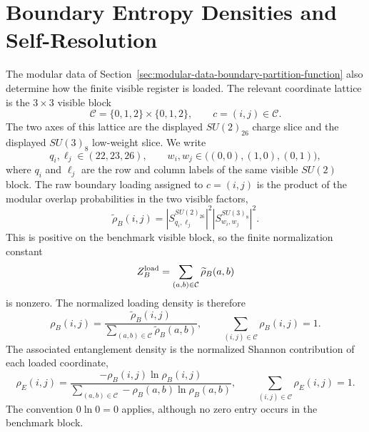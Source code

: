 \documentclass[11pt]{article}
\begin{document}
\section{Boundary Entropy Densities and Self-Resolution}
\label{sec:boundary-entropy-densities-self-resolution}

The modular data of Section~\ref{sec:modular-data-boundary-partition-function}
also determine how the finite visible register is loaded.  The relevant
coordinate lattice is the $3\times3$ visible block
\begin{equation}
\label{eq:section-four-coordinate-lattice}
 \mathcal C=\{0,1,2\}\times\{0,1,2\},
 \qquad
 c=(i,j)\in\mathcal C.
\end{equation}
The two axes of this lattice are the displayed $SU(2)_{26}$ charge slice and
the displayed $SU(3)_8$ low-weight slice.  We write
\begin{equation}
\label{eq:section-four-visible-labels}
 q_i,\ell_j\in(22,23,26),
 \qquad
 w_i,w_j\in\bigl((0,0),(1,0),(0,1)\bigr),
\end{equation}
where $q_i$ and $\ell_j$ are the row and column labels of the same visible
$SU(2)$ block.  The raw boundary loading assigned to $c=(i,j)$ is the product
of the modular overlap probabilities in the two visible factors,
\begin{equation}
\label{eq:section-four-raw-loading-density}
 \widetilde\rho_B(i,j)
 =
 \left|S^{SU(2)_{26}}_{q_i,\ell_j}\right|^2
 \left|S^{SU(3)_8}_{w_i,w_j}\right|^2.
\end{equation}
This is positive on the benchmark visible block, so the finite normalization
constant
\begin{equation}
\label{eq:section-four-loading-partition}
 Z_B^{\rm load}
 =
 \sum_{(a,b)\in\mathcal C}\widetilde\rho_B(a,b)
\end{equation}
is nonzero.  The normalized loading density is therefore
\begin{equation}
\label{eq:section-four-normalized-loading-density}
 \rho_B(i,j)
 =
 \frac{\widetilde\rho_B(i,j)}
 {\sum_{(a,b)\in\mathcal C}\widetilde\rho_B(a,b)},
 \qquad
 \sum_{(i,j)\in\mathcal C}\rho_B(i,j)=1.
\end{equation}
The associated entanglement density is the normalized Shannon contribution of
each loaded coordinate,
\begin{equation}
\label{eq:section-four-normalized-entanglement-density}
 \rho_E(i,j)
 =
 \frac{-\rho_B(i,j)\ln\rho_B(i,j)}
 {\sum_{(a,b)\in\mathcal C}-\rho_B(a,b)\ln\rho_B(a,b)},
 \qquad
 \sum_{(i,j)\in\mathcal C}\rho_E(i,j)=1.
\end{equation}
The convention $0\ln0=0$ applies, although no zero entry occurs in the
benchmark block.
\end{document}
